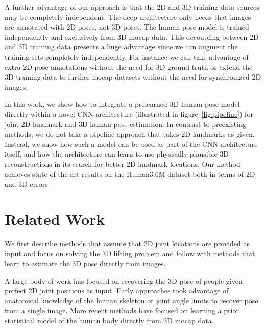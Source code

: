 \documentclass[10pt,twocolumn,letterpaper]{article}
\begin{document}
A further advantage of our approach is that the  2D and 3D training
data sources may be completely independent. The  deep
architecture only needs that images are annotated with 2D poses, not
3D poses. The human pose model is trained independently and
exclusively from 3D mocap data. This decoupling between 2D and 3D
training data presents a huge advantage since we can augment the 
training sets completely independently. For instance we can take
advantage of extra 2D pose annotations without the need for 3D ground
truth or extend the 3D training data to further mocap datasets without
the need for synchronized 2D images.

 In this work, we show how to integrate a
prelearned 3D human pose model directly within a novel CNN architecture
 (illustrated in figure~\ref{fig:pipeline}) for joint 2D landmark
and 3D human pose estimation. In contrast to preexisting methods, we
do not take a pipeline approach that takes 2D landmarks as
given. Instead, we show how such a model can be used as part of the
CNN architecture itself, and how the architecture can learn to use
physically plausible 3D reconstructions in its search for better 2D
landmark locations. Our method achieves state-of-the-art results on
the Human3.6M dataset both in terms of 2D and 3D errors.





\section{Related Work}
We first describe methods that assume that 2D joint
locations are provided as input and focus on solving the 3D lifting
problem and follow with methods that learn to estimate the 3D pose
directly from images.

 A large body of work
has focused on recovering the 3D pose of people given perfect 2D joint
positions as input. Early approaches \cite{lee1985determination,
  taylor2000reconstruction, parameswaran2004view,
  barron2001estimating} took advantage of anatomical knowledge of the
human skeleton or joint angle limits to recover pose from a single
image. More recent methods \cite{fan2014pose,
  ramakrishna2012reconstructing,akhter2015pose} have focused on learning a prior
statistical model of the human body directly from 3D mocap
data.
\end{document}
